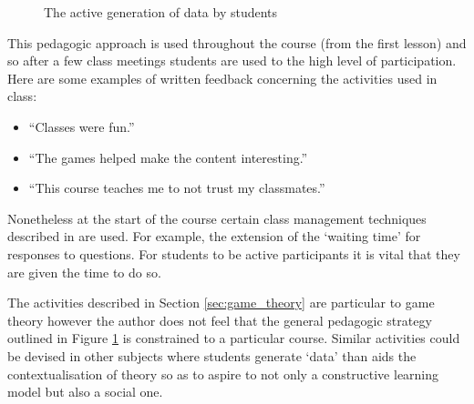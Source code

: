 \documentclass[12pt]{article}
\begin{document}
\begin{figure}[!hbtp]
    \centering
    \caption{The active generation of data by students}
    \label{fig:use_of_data}
\end{figure}

This pedagogic approach is used throughout the course (from the first lesson)
and so after a few class meetings students are used to the high level of
participation. Here are some examples of written feedback concerning the
activities used in class:

\begin{itemize}
    \item ``Classes were fun.''
    \item ``The games helped make the content interesting.''
    \item ``This course teaches me to not trust my classmates.''
\end{itemize}

Nonetheless at the start of the course certain class management
techniques described in \cite{Rocca2010} are used. For example, the extension of
the `waiting time' for responses to questions. For students to be active
participants it is vital that they are given the time to do so.


The activities described in Section \ref{sec:game_theory} are particular to game
theory however the author does not feel that the general pedagogic strategy
outlined in Figure \ref{fig:use_of_data} is constrained to a particular course.
Similar activities could be devised in other subjects where students generate
`data' than aids the contextualisation of theory so as to aspire to not only a
constructive learning model but also a social one.

\printbibliography
\end{document}
